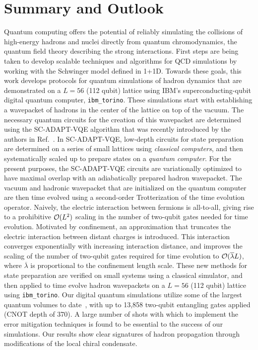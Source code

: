\documentclass[aps, prc, tightenlines,superscriptaddress, letterpaper, amsmath, amssymb, preprintnumbers, floatfix, longbibliography, nofootinbib]{revtex4-2}
\begin{document}
\section{Summary and Outlook}
\label{sec:Summary}
\noindent
Quantum computing offers the potential of reliably simulating the collisions of high-energy hadrons and nuclei directly from quantum chromodynamics, the quantum field theory describing the strong interactions.
First steps are being taken to develop scalable techniques and algorithms for QCD simulations by working with the Schwinger model defined in 1+1D. 
Towards these goals, this work develops
protocols for quantum simulations of hadron dynamics that are demonstrated on a $L=56$ (112 qubit) lattice using IBM's superconducting-qubit digital quantum computer, {\tt ibm\_torino}.
These simulations start with establishing a wavepacket of hadrons in the center of the lattice on top of the vacuum.
The necessary quantum circuits for the creation of this wavepacket are determined using the SC-ADAPT-VQE algorithm that was recently introduced by the authors in Ref.~\cite{Farrell:2023fgd}.
In SC-ADAPT-VQE, low-depth circuits for state preparation are determined on a series of small lattices using {\it classical computers}, and then systematically scaled up to prepare states on a {\it quantum computer}.
For the present purposes, the SC-ADAPT-VQE circuits are variationally optimized to have maximal overlap with an adiabatically prepared hadron wavepacket.
The vacuum and hadronic wavepacket that are initialized on the quantum computer are then time evolved using a second-order Trotterization of the time evolution operator.
Naively, the electric interaction between fermions is all-to-all, giving rise to a prohibitive ${\cal O}(L^2)$ scaling in the number of two-qubit gates needed for time evolution.
Motivated by confinement, an approximation that truncates the electric interaction between distant charges is introduced.
This interaction converges exponentially with increasing interaction distance, and improves the scaling of the number of two-qubit gates required for time evolution to ${\cal O}(\overline{\lambda} L)$, where $\overline{\lambda}$ is proportional to the confinement length scale.
These new methods for state preparation are verified on small systems using a classical simulator, and then applied to time evolve hadron wavepackets on a $L=56$ (112 qubit) lattice using {\tt ibm\_torino}.
Our digital quantum simulations utilize some of the largest quantum volumes to date~\cite{Yu:2022ivm,Kim:2023bwr,Shtanko:2023tjn,Farrell:2023fgd,Baumer:2023vrf,Chen:2023tfg,Liao:2023eug,Chowdhury:2023vbk}, with up to 13,858 two-qubit entangling gates applied (CNOT depth of 370).
A large number of shots with which to implement the error mitigation techniques is found to be essential to the success of our simulations. Our results show clear signatures of hadron propagation through modifications of the local chiral condensate.
\end{document}
